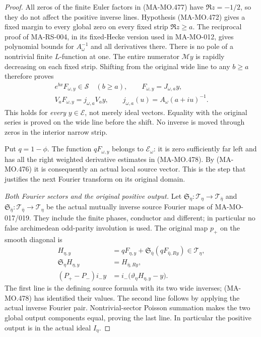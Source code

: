 \begin{proof}
All zeros of the finite Euler factors in (MA-MO.477) have
\(\Re z=-1/2\), so they do not affect the positive
inverse lines. Hypothesis (MA-MO.472) gives a fixed margin
to every global zero on every fixed strip \(\Re z\ge a\).
The reciprocal proof of MA-RS-004, in its fixed-Hecke version
used in MA-MO-012, gives polynomial bounds for
\(A_\omega^{-1}\) and all derivatives there. There is
no pole of a nontrivial finite \(L\)-function at one.
The entire numerator \(\mathcal My\) is rapidly decreasing
on each fixed strip. Shifting from the original wide line
to any \(b\ge a\) therefore proves
\[
 \begin{gathered}
 e^{bx}F_{\omega,y}\in\mathscr S\quad(b\ge a),\qquad
 F_{\omega,y}=J_{\omega,a}y,\\
 V_aF_{\omega,y}=j_{\omega,a}V_ay,\qquad
 j_{\omega,a}(u)=A_\omega(a+iu)^{-1}.
 \end{gathered}
 \tag{MA-MO.478}
\]
This holds for \emph{every} \(y\in\mathcal E\), not
merely ideal vectors. Equality with the original series is
proved on the wide line before the shift. No inverse is
moved through zeros in the interior narrow strip.

Put \(q=1-\phi\). The function \(qF_{\omega,y}\) belongs
to \(\mathcal E_\omega\): it is zero sufficiently far
left and has all the right weighted derivative estimates
in (MA-MO.478). By (MA-MO.476) it is consequently an actual
local source vector. This is the step that justifies the
next Fourier transform on its original domain.

\emph{Both Fourier sectors and the original positive output.}
Let \(\mathfrak S_\eta:\mathcal T_\eta\to
\mathcal T_{\bar\eta}\) and
\(\mathfrak S_{\bar\eta}:\mathcal T_{\bar\eta}\to
\mathcal T_\eta\) be the actual mutually inverse source
Fourier maps of MA-MO-017/019. They include the finite
phases, conductor and different; in particular no false
archimedean odd-parity involution is used. The original
map \(p_+\) on the smooth diagonal is
\[
 \begin{aligned}
 H_{\eta,y}&=qF_{\eta,y}
                 +\mathfrak S_{\bar\eta}(qF_{\bar\eta,Ry})
                                      \in\mathcal T_\eta,\\
 \mathfrak S_\eta H_{\eta,y}&=H_{\bar\eta,Ry},\\
 (P_+-P_-)i_-y
    &=i_-\bigl(\vartheta_\eta H_{\eta,y}-y\bigr).
 \end{aligned}
 \tag{MA-MO.479}
\]
The first line is the defining source formula with its two
wide inverses; (MA-MO.478) has identified their values.
The second line follows by applying the actual inverse
Fourier pair. Nontrivial-sector Poisson summation makes
the two global output components equal, proving the last
line. In particular the positive output is in the actual
ideal \(I_\eta\).


\end{proof}

